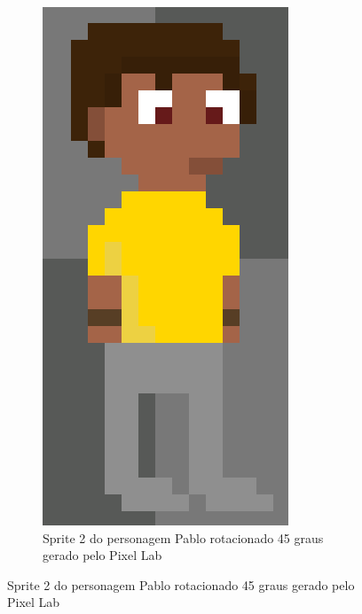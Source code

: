 \begin{figure}[htbp]
\begin{subfigure}{0.23\linewidth}
        \includegraphics[width=1\linewidth]{figs/pixelLab/dia3/fix1.PNG}
        \caption{\small Sprite 2 do personagem Pablo rotacionado 45 graus gerado pelo Pixel Lab}

\end{subfigure}
\end{figure}

